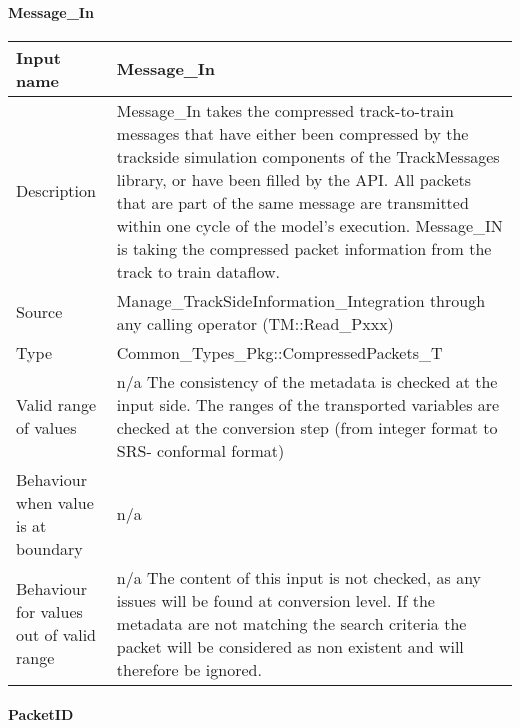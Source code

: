 

\paragraph{Message\_In}

\begin{longtable}{p{}p{}}
\toprule
Input name				&Message\_In \\
\midrule
Description				& Message\_In takes the compressed track-to-train messages that have either been compressed by the trackside simulation components of the TrackMessages library, or have been filled by the API. All packets that are part of the same message are transmitted within one cycle of the model's execution. Message\_IN is taking the compressed packet information from the track to train dataflow. \newline
  \\
\midrule
Source					& Manage\_TrackSideInformation\_Integration through any calling operator (TM::Read\_Pxxx) \\ 
\midrule
Type					& Common\_Types\_Pkg::CompressedPackets\_T \\
\midrule
Valid range of values 	& n/a\newline
The consistency of the metadata is checked at the input side.\newline
The ranges of the transported variables are checked at the conversion step (from integer format to SRS- conformal format)
 \\
\midrule
Behaviour when value is at boundary	& n/a \\
\midrule
Behaviour for values out of valid range	& n/a \newline \newline
The content of this input is not checked, as any issues will be found at conversion level. If the metadata are not matching the search criteria the packet will be considered as non existent and will therefore be ignored. 
 \\
\bottomrule
\end{longtable}



\paragraph{PacketID}

